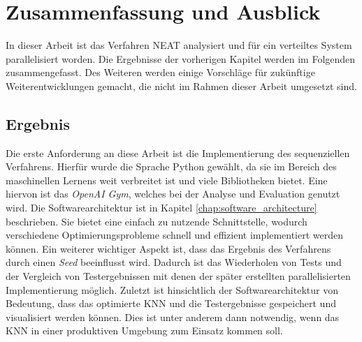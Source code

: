 \chapter{Zusammenfassung und Ausblick}
In dieser Arbeit ist das Verfahren \ac{NEAT} analysiert und für ein verteiltes System parallelisiert worden. Die Ergebnisse der vorherigen Kapitel werden im Folgenden zusammengefasst. Des Weiteren werden einige Vorschläge für zukünftige Weiterentwicklungen gemacht, die nicht im Rahmen dieser Arbeit umgesetzt sind.  

\section{Ergebnis}
Die erste Anforderung an diese Arbeit ist die Implementierung des sequenziellen Verfahrens. Hierfür wurde die Sprache Python gewählt, da sie im Bereich des maschinellen Lernens weit verbreitet ist und viele Bibliotheken bietet. Eine hiervon ist das \emph{OpenAI Gym}, welches bei der Analyse und Evaluation genutzt wird. Die Softwarearchitektur ist in Kapitel \ref{chap:software_architecture} beschrieben. Sie bietet eine einfach zu nutzende Schnittstelle, wodurch verschiedene Optimierungsprobleme schnell und effizient implementiert werden können. Ein weiterer wichtiger Aspekt ist, dass das Ergebnis des Verfahrens durch einen \emph{Seed} beeinflusst wird. Dadurch ist das Wiederholen von Tests und der Vergleich von Testergebnissen mit denen der später erstellten parallelisierten Implementierung möglich. Zuletzt ist hinsichtlich der Softwarearchitektur von Bedeutung, dass das optimierte \ac{KNN} und die Testergebnisse gespeichert und visualisiert werden können. Dies ist unter anderem dann notwendig, wenn das \ac{KNN} in einer produktiven Umgebung zum Einsatz kommen soll.
\\\\
